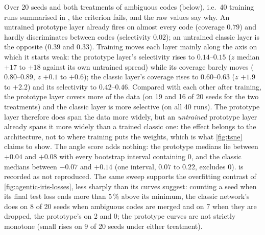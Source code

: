 Over 20 seeds and both treatments of ambiguous codes (below), i.e.\ 40 training runs summarised
in , the criterion fails, and the raw values say why.  An
untrained prototype layer already fires on almost every code (coverage $0.79$) and hardly
discriminates between codes (selectivity $0.02$); an untrained classic layer is the opposite
($0.39$ and $0.33$).  Training moves each layer mainly along the axis on which it starts weak:
the prototype layer's selectivity rises to $0.14$--$0.15$ ($z$ median $+17$ to $+18$ against
its own untrained spread) while its coverage barely moves ($0.80$--$0.89$, $z$ $+0.1$ to
$+0.6$); the classic layer's coverage rises to $0.60$--$0.63$ ($z$ $+1.9$ to $+2.2$) and its
selectivity to $0.42$--$0.46$.  Compared with each other after training, the prototype layer
covers more of the data (on 19 and 16 of 20 seeds for the two treatments) and the classic layer
is more selective (on all 40 runs).  The prototype layer therefore does span the data more
widely, but an \emph{untrained} prototype layer already spans it more widely than a trained
classic one: the effect belongs to the architecture, not to where training puts the weights,
which is what \cref{fig:tsne} claims to show.  The angle score adds nothing: the prototype
medians lie between $+0.04$ and $+0.08$ with every bootstrap interval containing $0$, and the
classic medians between $-0.07$ and $+0.14$ (one interval, $0.07$ to $0.22$, excludes $0$).
 is recorded as not reproduced.  The same sweep supports the overfitting contrast
of \cref{fig:agentic-iris-losses}, less sharply than its curves suggest: counting a seed when its
final test loss ends more than $5\,\%$ above its minimum, the classic network's does on 8 of 20
seeds when ambiguous codes are merged and on 7 when they are dropped, the prototype's on 2 and 0;
the prototype curves are not strictly monotone (small rises on 9 of 20 seeds under either
treatment).

